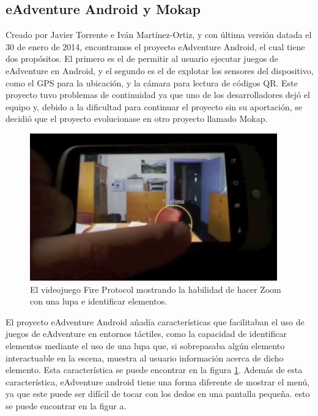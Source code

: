 \subsection{eAdventure Android y Mokap}
\label{eandroidmokap}

Creado por Javier Torrente e Iván Martínez-Ortiz, y con última versión datada el 30 de enero de 2014, encontramos el proyecto eAdventure Android, el cual tiene dos propósitos. El primero es el de permitir al usuario ejecutar juegos de eAdventure en Android, y el segundo es el de explotar los sensores del dispositivo, como el GPS para la ubicación, y la cámara para lectura de códigos QR. Este proyecto tuvo problemas de continuidad ya que uno de los desarrolladores dejó el equipo y, debido a la dificultad para continuar el proyecto sin su aportación, se decidió que el proyecto evolucionase en otro proyecto llamado Mokap.

\begin{figure}[htb]
	\includegraphics[height=2.5in]{figures/eandroid.png}
	\caption[eAdventure Android - Lupa]{El videojuego Fire Protocol mostrando la habilidad de hacer Zoom con una lupa e identificar elementos.}
	\label{eandroidlupa}
\end{figure}

El proyecto eAdventure Android añadía características que facilitaban el uso de juegos de eAdventure en entornos táctiles, como la capacidad de identificar elementos mediante el uso de una lupa que, si sobrepasaba algún elemento interactuable en la escena, muestra al usuario información acerca de dicho elemento. Esta característica se puede encontrar en la figura \ref{eandroidlupa}. Además de esta característica, eAdventure android tiene una forma diferente de mostrar el menú, ya que este puede ser difícil de tocar con los dedos en una pantalla pequeña. esto se puede encontrar en la figur a\label{eandroidmenu}.

